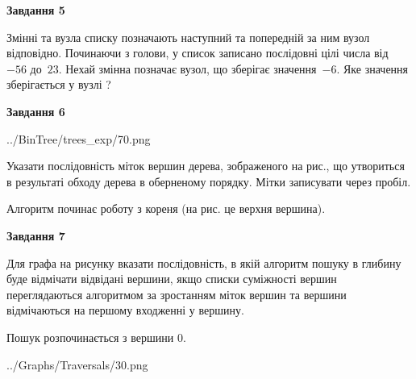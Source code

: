 \documentclass[12pt, ukrainian]{article}
\begin{document}
{\begin {large}
{\begin {center}\textbf{Завдання 5}\end {center}}\par
Змінні  та  вузла списку позначають наступний та попередній за ним вузол відповідно. Починаючи з голови, у список записано послідовні цілі числа від~$-56$ до~$23$. Нехай змінна  позначає вузол, що зберігає значення~$-6$.
Яке значення зберігається у вузлі  ?\par
\newpage

{\begin {center}\textbf{Завдання 6}\end {center}}\par

\begin{center}
	{../BinTree/trees_exp/70.png}
\end{center}
Указати послідовність міток вершин дерева, зображеного на рис., що утвориться в результаті обходу дерева в оберненому порядку. Мітки записувати через пробіл.\par Алгоритм починає роботу з кореня (на рис. це верхня вершина).\par
\newpage

{\begin {center}\textbf{Завдання 7}\end {center}}\par
Для графа на рисунку вказати послідовність, в якій алгоритм пошуку в глибину буде відмічати відвідані вершини, якщо списки суміжності вершин переглядаються алгоритмом за зростанням міток вершин та вершини відмічаються на першому вход\-женні у вершину.\par
Пошук розпочинається з вершини 0.\par

\begin{center}
	{../Graphs/Traversals/30.png}
\end{center}\par
\newpage


\end{large}}
\end{document}
